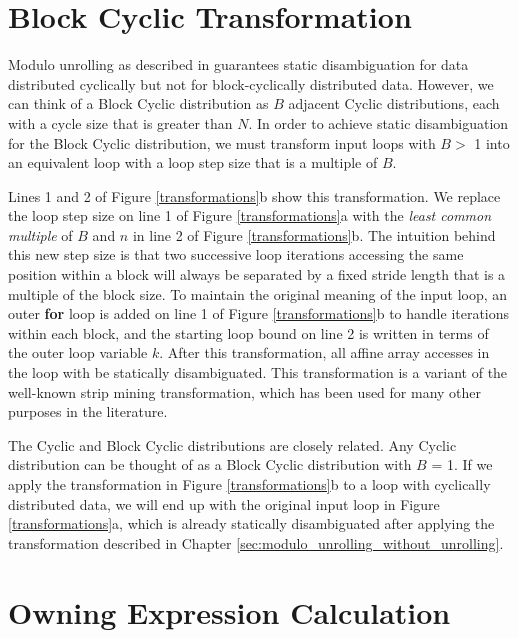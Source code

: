 \section{Block Cyclic Transformation}\label{sec:block_cyclic_transformation}

Modulo unrolling as described in \cite{barua1999maps} guarantees static disambiguation for data distributed cyclically but not for block-cyclically distributed data. However, we can think of a Block Cyclic distribution as $B$ adjacent Cyclic distributions, each with a cycle size that is greater than $N$. In order to achieve static disambiguation for the Block Cyclic distribution, we must transform input loops with $B >$ 1 into an equivalent loop with a loop step size that is a multiple of $B$. 

Lines 1 and 2 of Figure \ref{transformations}b show this transformation. We replace the loop step size on line 1 of Figure \ref{transformations}a with the \textit{least common multiple} of $B$ and $n$ in line 2 of Figure \ref{transformations}b. The intuition behind this new step size is that two successive loop iterations accessing the same position within a block will always be separated by a fixed stride length that is a multiple of the block size. To maintain the original meaning of the input loop, an outer \textbf{for} loop is added on line 1 of Figure \ref{transformations}b to handle iterations within each block, and the starting loop bound on line 2 is written in terms of the outer loop variable $k$. After this transformation, all affine array accesses in the loop with be statically disambiguated. This transformation is a variant of the well-known strip mining transformation, which has been used for many other purposes in the literature.

The Cyclic and Block Cyclic distributions are closely related. Any Cyclic distribution can be thought of as a Block Cyclic distribution with $B$ = 1. If we apply the transformation in Figure \ref{transformations}b to a loop with cyclically distributed data, we will end up with the original input loop in Figure \ref{transformations}a, which is already statically disambiguated after applying the transformation described in Chapter \ref{sec:modulo_unrolling_without_unrolling}. 

\section{Owning Expression Calculation}\label{sec:owning_expression_calculation}

